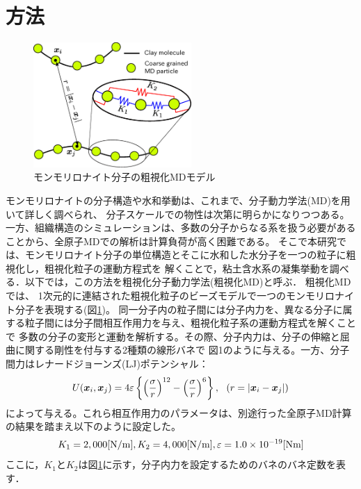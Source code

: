 ﻿\documentclass[11pt,a4j]{jarticle}
\begin{document}
\section{方法}
\begin{figure}
	\centering
	\includegraphics[keepaspectratio,width=60mm]{Figs/cg_model.eps}
	\caption{モンモリロナイト分子の粗視化MDモデル}
	\label{fig:fig1}
\end{figure}
モンモリロナイトの分子構造や水和挙動は、これまで、分子動力学法(MD)を用いて詳しく調べられ、
分子スケールでの物性は次第に明らかになりつつある\cite{Kawamura}。
一方、組織構造のシミュレーションは、多数の分子からなる系を扱う必要があることから、全原子MDでの解析は計算負荷が高く困難である。
そこで本研究では、モンモリロナイト分子の単位構造とそこに水和した水分子を一つの粒子に粗視化し，粗視化粒子の運動方程式を
解くことで，粘土含水系の凝集挙動を調べる．以下では，この方法を粗視化分子動力学法(粗視化MD)と呼ぶ．
粗視化MDでは、 1次元的に連結された粗視化粒子のビーズモデルで一つのモンモリロナイト分子を表現する(図\ref{fig:fig1})。
同一分子内の粒子間には分子内力を、異なる分子に属する粒子間には分子間相互作用力を与え、粗視化粒子系の運動方程式を解くことで
多数の分子の変形と運動を解析する。その際、分子内力は、分子の伸縮と屈曲に関する剛性を付与する2種類の線形バネで
図1のように与える。一方、分子間力はレナードジョーンズ(LJ)ポテンシャル：
\begin{equation}
	U(\mbox{\boldmath $x$}_i,\mbox{\boldmath $x$}_j)=4\varepsilon
	\left\{ \left(\frac{\sigma}{r}\right)^{12}-
	\left( \frac{\sigma}{r}\right)^6\right\}, 
	\ \ \left(r=\left| \mbox{\boldmath $x$}_i-\mbox{\boldmath $x$}_j\right|\right)
	\label{eqn:LJ}
\end{equation}
によって与える。これら相互作用力のパラメータは、別途行った全原子MD計算の結果を踏まえ以下のように設定した。
\begin{equation}
	K_1  = 2,000[{\rm N / m}],   K_2  = 4,000[{\rm N / m}],  \varepsilon = 1.0\times10^{-19}     [{\rm Nm}]
	\label{eqn:prms}
\end{equation}
ここに，$K_1$と$K_2$は図\ref{fig:fig1}に示す，分子内力を設定するためのバネのバネ定数を表す．
\end{document}
